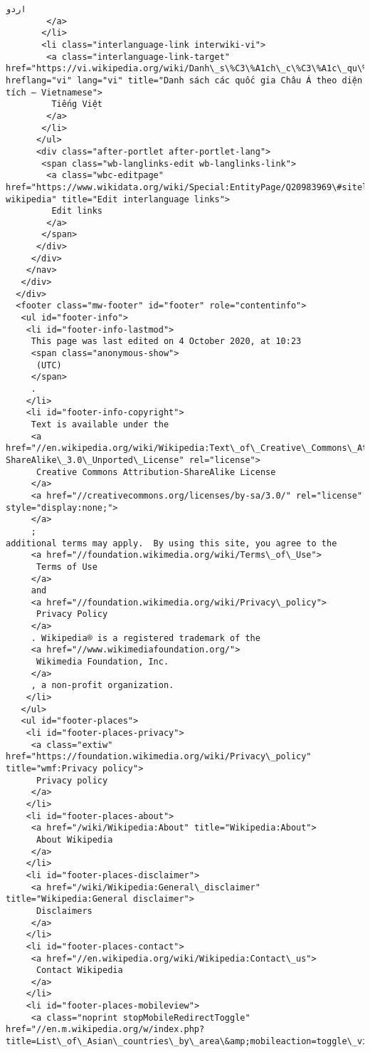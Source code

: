 \documentclass[11pt]{article}
\begin{document}
\begin{Verbatim}[commandchars=\\\{\}]
         اردو
        </a>
       </li>
       <li class="interlanguage-link interwiki-vi">
        <a class="interlanguage-link-target" href="https://vi.wikipedia.org/wiki/Danh\_s\%C3\%A1ch\_c\%C3\%A1c\_qu\%E1\%BB\%91c\_gia\_Ch\%C3\%A2u\_\%C3\%81\_theo\_di\%E1\%BB\%87n\_t\%C3\%ADch" hreflang="vi" lang="vi" title="Danh sách các quốc gia Châu Á theo diện tích – Vietnamese">
         Tiếng Việt
        </a>
       </li>
      </ul>
      <div class="after-portlet after-portlet-lang">
       <span class="wb-langlinks-edit wb-langlinks-link">
        <a class="wbc-editpage" href="https://www.wikidata.org/wiki/Special:EntityPage/Q20983969\#sitelinks-wikipedia" title="Edit interlanguage links">
         Edit links
        </a>
       </span>
      </div>
     </div>
    </nav>
   </div>
  </div>
  <footer class="mw-footer" id="footer" role="contentinfo">
   <ul id="footer-info">
    <li id="footer-info-lastmod">
     This page was last edited on 4 October 2020, at 10:23
     <span class="anonymous-show">
      (UTC)
     </span>
     .
    </li>
    <li id="footer-info-copyright">
     Text is available under the
     <a href="//en.wikipedia.org/wiki/Wikipedia:Text\_of\_Creative\_Commons\_Attribution-ShareAlike\_3.0\_Unported\_License" rel="license">
      Creative Commons Attribution-ShareAlike License
     </a>
     <a href="//creativecommons.org/licenses/by-sa/3.0/" rel="license" style="display:none;">
     </a>
     ;
additional terms may apply.  By using this site, you agree to the
     <a href="//foundation.wikimedia.org/wiki/Terms\_of\_Use">
      Terms of Use
     </a>
     and
     <a href="//foundation.wikimedia.org/wiki/Privacy\_policy">
      Privacy Policy
     </a>
     . Wikipedia® is a registered trademark of the
     <a href="//www.wikimediafoundation.org/">
      Wikimedia Foundation, Inc.
     </a>
     , a non-profit organization.
    </li>
   </ul>
   <ul id="footer-places">
    <li id="footer-places-privacy">
     <a class="extiw" href="https://foundation.wikimedia.org/wiki/Privacy\_policy" title="wmf:Privacy policy">
      Privacy policy
     </a>
    </li>
    <li id="footer-places-about">
     <a href="/wiki/Wikipedia:About" title="Wikipedia:About">
      About Wikipedia
     </a>
    </li>
    <li id="footer-places-disclaimer">
     <a href="/wiki/Wikipedia:General\_disclaimer" title="Wikipedia:General disclaimer">
      Disclaimers
     </a>
    </li>
    <li id="footer-places-contact">
     <a href="//en.wikipedia.org/wiki/Wikipedia:Contact\_us">
      Contact Wikipedia
     </a>
    </li>
    <li id="footer-places-mobileview">
     <a class="noprint stopMobileRedirectToggle" href="//en.m.wikipedia.org/w/index.php?title=List\_of\_Asian\_countries\_by\_area\&amp;mobileaction=toggle\_view\_mobile">

\end{Verbatim}
\end{document}
